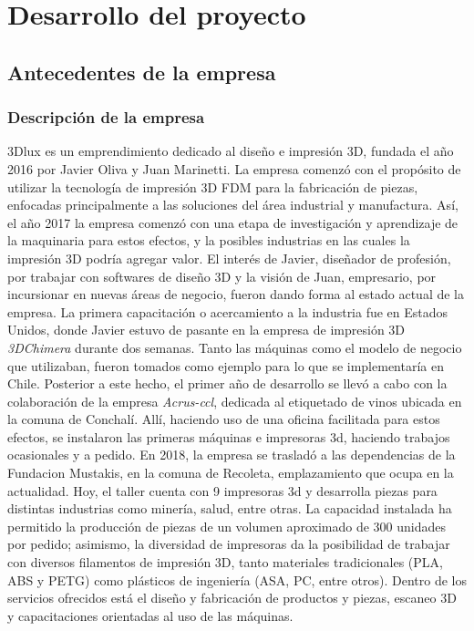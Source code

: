 \chapter{Desarrollo del proyecto}
\label{cap:estadodelarte}


\section{Antecedentes de la empresa}

\subsection{Descripción de la empresa}

3Dlux es un emprendimiento dedicado al diseño e impresión 3D, fundada el año 2016 por Javier Oliva y Juan Marinetti. La empresa comenzó con el propósito de utilizar la tecnología de impresión 3D FDM para la fabricación de piezas, enfocadas principalmente a las soluciones del área industrial y manufactura. Así, el año 2017 la empresa comenzó con una etapa de investigación y aprendizaje de la maquinaria para estos efectos, y la posibles industrias en las cuales la impresión 3D podría agregar valor. El interés de Javier, diseñador de profesión, por trabajar con softwares de diseño 3D y la visión de Juan, empresario, por incursionar en nuevas áreas de negocio, fueron dando forma al estado actual de la empresa. 
La primera capacitación o acercamiento a la industria fue en Estados Unidos, donde Javier estuvo de pasante en la empresa de impresión 3D \textit{3DChimera} durante dos semanas. Tanto las máquinas como el modelo de negocio que utilizaban, fueron tomados como ejemplo para lo que se implementaría en Chile. Posterior a este hecho, el primer año de desarrollo se llevó a cabo con la colaboración de la empresa \textit{Acrus-ccl}, dedicada al etiquetado de vinos ubicada en la comuna de Conchalí. Allí, haciendo uso de una oficina facilitada para estos efectos, se instalaron las primeras máquinas e impresoras 3d, haciendo trabajos ocasionales y a pedido. En 2018, la empresa se trasladó a las dependencias de la Fundacion Mustakis, en la comuna de Recoleta, emplazamiento que ocupa en la actualidad. Hoy, el taller cuenta con 9 impresoras 3d y desarrolla piezas para distintas industrias como minería, salud, entre otras. La capacidad instalada ha permitido la producción de piezas de un volumen aproximado de 300 unidades por pedido; asimismo, la diversidad de impresoras da la posibilidad de trabajar con diversos filamentos de impresión 3D, tanto materiales tradicionales (PLA, ABS y PETG) como plásticos de ingeniería (ASA, PC, entre otros). Dentro de los servicios ofrecidos está el diseño y fabricación de productos y piezas, escaneo 3D y capacitaciones orientadas al uso de las máquinas. 

